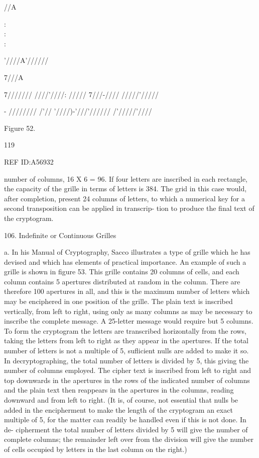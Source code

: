   

//A

 

   

:\\:\\:

 

      
 


 

   

       
    
   

’////A'//////

7///A

7/////// ////'////: /////
7///-//// /////’/////

-
//////// /’//
'////)-’///'////// /’/////’////

  
    

 

    

Figure 52.

119

REF ID:A56932

number of columns, 16 X 6 = 96. If four letters are inscribed in each
rectangle, the capacity of the grille in terms of letters is 384. The grid in
this case would, after completion, present 24 columns of letters, to which
a numerical key for a second transposition can be applied in transcrip-
tion to produce the ﬁnal text of the cryptogram.

106. Indeﬁnite or Continuous Grilles

a. In his Manual of Cryptography, Sacco illustrates a type of grille
which he has devised and which has elements of practical importance.
An example of such a grille is shown in ﬁgure 53. This grille contains 20
columns of cells, and each column contains 5 apertures distributed at
random in the column. There are therefore 100 apertures in all, and
this is the maximum number of letters which may be enciphered in one
position of the grille. The plain text is inscribed vertically, from left to
right, using only as many columns as may be necessary to inscribe the
complete message. A 25-letter message would require but 5 columns. To
form the cryptogram the letters are transcribed horizontally from the
rows, taking the letters from left to right as they appear in the apertures.
If the total number of letters is not a multiple of 5, suﬂicient nulls are
added to make it so. In decryptographing, the total number of letters is
divided by 5, this giving the number of columns employed. The cipher
text is inscribed from left to right and top downwards in the apertures
in the rows of the indicated number of columns and the plain text then
reappears in the apertures in the columns, reading downward and from
left to right. (It is, of course, not essential that nulls be added in the
encipherment to make the length of the cryptogram an exact multiple of
5, for the matter can readily be handled even if this is not done. In de-
cipherment the total number of letters divided by 5 will give the number
of complete columns; the remainder left over from the division will give
the number of cells occupied by letters in the last column on the right.)

